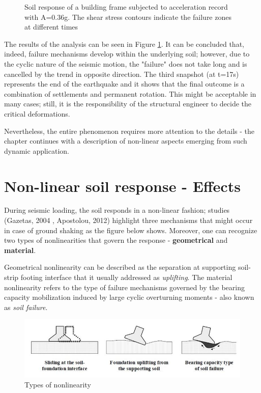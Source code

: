 \documentclass[12pt,a4paper]{report}
\begin{document}
\begin{figure}[!h]
\begin{minipage}[b]{0.45\textwidth}
   		\caption{Soil response of a building frame subjected to acceleration record with A=0.36g. The shear stress contours indicate the failure zones at different times}
   		\label{new4}
   	\end{minipage}
   \end{figure} 
  
 The results of the analysis can be seen in Figure \ref{new4}. It can be concluded that, indeed, failure mechanisms develop within the underlying soil; however, due to the cyclic nature of the seismic motion, the "failure" does not take long and is cancelled by the trend in opposite direction. The third snapshot (at t=17s) represents the end of the earthquake and it shows that the final outcome is a combination of settlements and permanent rotation. This might be acceptable in many cases; still, it is the responsibility of the structural engineer to decide the critical deformations.
 
 
 Nevertheless, the entire phenomenon requires more attention to the details - the chapter continues with a description of non-linear aspects emerging from such dynamic application.
  
  \newpage
\section{Non-linear soil response - Effects}
During seismic loading, the soil responds in a non-linear fashion; studies (Gazetas, 2004 \cite{gazetas2004nonlinear}, Apostolou, 2012\cite{apostolou2011soil}) highlight three mechanisms that might occur in case of ground shaking as the figure below shows. Moreover, one can recognize two types of nonlinearities that govern the response - \textbf{geometrical} and \textbf{material}.

Geometrical nonlinearity can be described as the separation at supporting soil-strip footing interface that it usually addressed as \textit{uplifting}. The material nonlinearity refers to the type of failure mechanisms governed by the bearing capacity mobilization induced by large cyclic overturning moments - also known as \textit{soil failure}. 

\begin{figure}[h!]
	\centering
	\includegraphics[width=0.7\linewidth]{"nonlin"}
	\caption{Types of nonlinearity}
	\label{types}
\end{figure}
\end{document}
